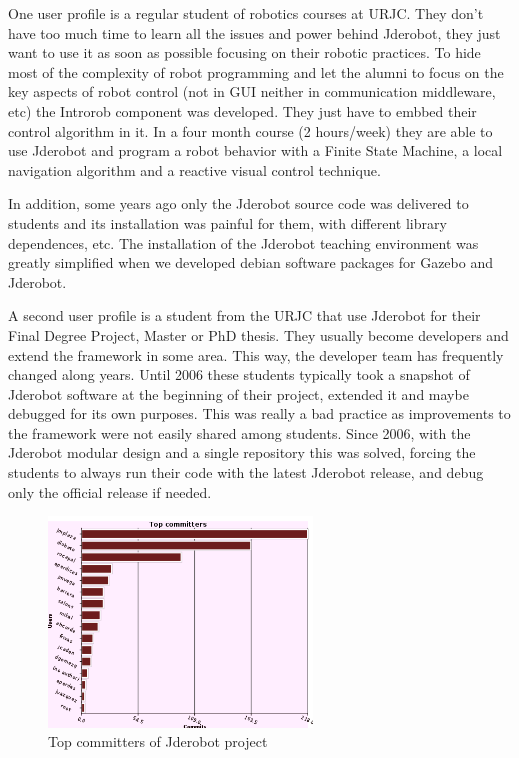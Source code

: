 \documentclass[twocolumn]{svjour3}          %
\begin{document}
One user profile is a regular student of robotics courses at URJC. They don't have too much time to learn all the issues and power behind Jderobot, they just want to use it as soon as possible focusing on their robotic practices. To hide most of the complexity of robot programming and let the alumni to focus on the key aspects of robot control (not in GUI neither in communication middleware, etc) the Introrob component was developed. They just have to embbed their control algorithm in it. In a four month course (2 hours/week) they are able to use Jderobot and program a robot behavior with a Finite State Machine, a local navigation algorithm and a reactive visual control technique. 

In addition, some years ago only the Jderobot source code was delivered to students and its installation was painful for them, with different library dependences, etc. The installation of the Jderobot teaching environment was greatly simplified when we developed debian software packages for Gazebo and Jderobot.

A second user profile is a student from the URJC that use Jderobot for their Final Degree Project, Master or PhD thesis. They usually become developers and extend the framework in some area. This way, the developer team has frequently changed along years. Until 2006 these students typically took a snapshot of Jderobot software at the beginning of their project, extended it and maybe debugged for its own purposes. This was really a bad practice as improvements to the framework were not easily shared among students. Since 2006, with the Jderobot modular design and a single repository this was solved, forcing the students to always run their code with the latest Jderobot release, and debug only the official release if needed.

\begin{figure}
  \includegraphics[width=7cm]{figs/svn_top-committers.png}
\caption{Top committers of Jderobot project}
\label{fig:svn-topcommiters}
\end{figure}
\end{document}
